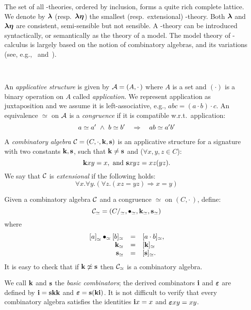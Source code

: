 The set of all \lam-theories, ordered by inclusion, forms a quite rich complete lattice.
We denote by $\boldsymbol{\lambda}$ (resp.\ $\boldsymbol{\lambda\eta}$) the smallest (resp.\ extensional) \lam-theory.
Both $\boldsymbol{\lambda}$ and $\boldsymbol{\lambda\eta}$ are consistent, semi-sensible but not sensible.
A \lam-theory can be introduced syntactically, or semantically as the theory of a model. The model theory of \lam-calculus is largely based on the notion of combinatory algebras, and its variations (see, e.g.,~\cite{Koymans82,Selinger02,Meyer82,HindleyLS72} and~\cite[Ch.~5]{Bare}).

\begin{defi}\
\bsub
\item An \emph{applicative structure} is given by $\mathcal{A} = (A,\cdot\,)$ where $A$ is a set and $(\cdot)$ is a binary operation on $A$ called \emph{application}.
We represent application as juxtaposition and we assume it is left-associative, e.g., $abc = (a\cdot b)\cdot c$.
An equivalence $\simeq$ on $\mathcal{A}$ is a \emph{congruence} if it is compatible w.r.t.\ application:
\[
	a \simeq a' \ \land \  b\simeq b'\quad \Rightarrow \quad ab\simeq a'b'
\]

\item
A \emph{combinatory algebra} $\mathcal{C} = (C, \cdot, {\mathbf{k}}, {\mathbf{s}})$ is an applicative structure for a signature with two constants ${\mathbf{k}},{\mathbf{s}}$, such that ${\mathbf{k}}\neq{\mathbf{s}}$ and  ($\forall x,y,z\in C$):
\[
{\mathbf{k}} xy=x, \textrm{ and }{\mathbf{s}} xyz=xz(yz).
\]
We say that $\mathcal{C}$ is \emph{extensional} if the following holds:
\[
	\forall x. \forall y.(\forall z .(xz = yz) \Rightarrow x = y)
\]
\item Given a combinatory algebra $\mathcal{C}$ and a congruence $\simeq$ on $(C,\cdot\,)$, define:
\[
	\mathcal{C}_\simeq = (C/_\simeq,\bullet_\simeq,{\mathbf{k}}_\simeq,{\mathbf{s}}_\simeq)
\]
where
\[
	\begin{array}{rcl}
	{[}a{]}_\simeq\bullet_\simeq [b]_\simeq &=& [a\cdot b]_\simeq,\\ %
	\ssk_\simeq &=& [\ssk]_\simeq\\
	\sss_\simeq &=& [\sss]_\simeq.\\
	\end{array}
\]
It is easy to check that if ${\mathbf{k}}\not\simeq{\mathbf{s}}$ then $\mathcal{C}_\simeq$ is a combinatory algebra.
\esub
\end{defi}

\noindent
We call ${\mathbf{k}}$ and ${\mathbf{s}}$ the \emph{basic combinators}; the derived combinators ${\mathbf{i}}$ and $\boldsymbol{\varepsilon}$ are defined by ${\mathbf{i}}= {\mathbf{s}}{\mathbf{k}}{\mathbf{k}}$ and $\boldsymbol{\varepsilon}= {\mathbf{s}}({\mathbf{k}}{\mathbf{i}})$.
It is not difficult to verify that every combinatory algebra satisfies the identities ${\mathbf{i}} x=x$ and $\boldsymbol{\varepsilon} xy=xy$.

